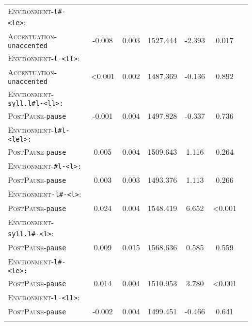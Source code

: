 \begin{table}[H]
{\begin{tabular}{lSSSSSS}
		\textsc{Environment}-\texttt{l\#-<le>}:&&&&&\\
		\textsc{Accentuation}-\texttt{unaccented} & -0.008 & 0.003 & 1527.444 & -2.393 & 0.017 \\ 
		
		\textsc{Environment}-\texttt{l-<ll>}:&&&&&\\
		\textsc{Accentuation}-\texttt{unaccented} & \color{lsGuidelinesGray} <0.001 &\color{lsGuidelinesGray}  0.002 & \color{lsGuidelinesGray} 1487.369 &\color{lsGuidelinesGray}  -0.136 & \color{lsGuidelinesGray} 0.892 \\ 
		
		\textsc{Environment}-\texttt{syll.l\#l-<ll>:}&&&&&\\
		\textsc{PostPause}-\texttt{pause} &\color{lsGuidelinesGray}  -0.001 &\color{lsGuidelinesGray}  0.004 & \color{lsGuidelinesGray} 1497.828 &\color{lsGuidelinesGray}  -0.337 & \color{lsGuidelinesGray} 0.736 \\ 
		
		\textsc{Environment}-\texttt{l\#l-<lel>:}&&&&&\\
		\textsc{PostPause}-\texttt{pause} &\color{lsGuidelinesGray}  0.005 &\color{lsGuidelinesGray}  0.004 &\color{lsGuidelinesGray} 1509.643 & \color{lsGuidelinesGray} 1.116 &\color{lsGuidelinesGray}  0.264 \\ 
		
		\textsc{Environment}-\texttt{\#l-<l>:}&&&&&\\
		\textsc{PostPause}-\texttt{pause} & \color{lsGuidelinesGray} 0.003 &\color{lsGuidelinesGray}  0.003 & \color{lsGuidelinesGray} 1493.376 &\color{lsGuidelinesGray}  1.113 & \color{lsGuidelinesGray} 0.266 \\ 
		
		\textsc{Environment}\texttt{-l\#-<l>}:&&&&&\\
		\textsc{PostPause}-\texttt{pause} & 0.024 & 0.004 & 1548.419 & 6.652 &  <0.001 \\ 
		
		\textsc{Environment}-\texttt{syll.l\#-<l>}:&&&&&\\
		\textsc{PostPause}-\texttt{pause} &\color{lsGuidelinesGray}  0.009 &\color{lsGuidelinesGray}  0.015 & \color{lsGuidelinesGray} 1568.636 &\color{lsGuidelinesGray}  0.585 & \color{lsGuidelinesGray} 0.559 \\ 
		
		\textsc{Environment}-\texttt{l\#-<le>:}&&&&&\\
		\textsc{PostPause}-\texttt{pause} & 0.014 & 0.004 & 1510.953 & 3.780 &  <0.001 \\
		
		\textsc{Environment}-\texttt{l-<ll>}:&&&&&\\
		\textsc{PostPause}-\texttt{pause} & \color{lsGuidelinesGray} -0.002 & \color{lsGuidelinesGray} 0.004 & \color{lsGuidelinesGray} 1499.451 &\color{lsGuidelinesGray}  -0.466 & \color{lsGuidelinesGray} 0.641 \\ 
	\lspbottomrule 
			\end{tabular}}
\end{table}


